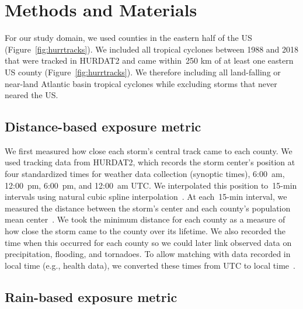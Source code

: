 \section*{Methods and Materials}

For our study domain, we used counties in the eastern half of the \ac{US}
(Figure~\ref{fig:hurrtracks}).  We included all tropical cyclones between 1988
and 2018 that were tracked in \ac{HURDAT2} \parencite{landsea2013} and came
within~250 \si{\kilo\metre} of at least one eastern \ac{US} county
(Figure~\ref{fig:hurrtracks}). We therefore including all land-falling or
near-land Atlantic basin tropical cyclones while excluding storms that never
neared the \ac{US}.  \subsection*{Distance-based exposure metric}

We first measured how close each storm's central track came to each county. We
used tracking data from \ac{HURDAT2}, which records the storm center's position
at four standardized times for weather data collection (synoptic times),
6:00~am, 12:00~pm, 6:00~pm, and 12:00~am \ac{UTC}.  We interpolated this
position to~15-\si{\minute} intervals using natural cubic spline
interpolation~\parencite{hurricaneexposure}. At each~15-\si{\minute} interval,
we measured the distance between the storm's center and each county's
population mean center~\parencite{countycenters}. We took the minimum distance
for each county as a measure of how close the storm came to the county over its
lifetime.  We also recorded the time when this occurred for each county so we
could later link observed data on precipitation, flooding, and tornadoes.  To
allow matching with data recorded in local time (e.g., health data), we
converted these times from \ac{UTC} to local time~\parencite{countytimezones}.

\subsection*{Rain-based exposure metric}

